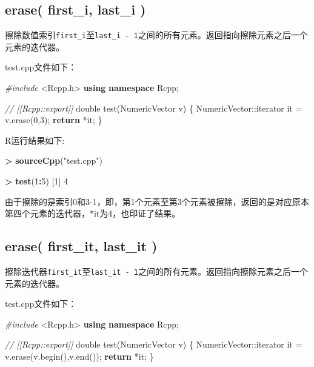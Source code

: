 \documentclass[]{ctexbook}
\newenvironment{Shaded}{\begin{snugshade}}{\end{snugshade}}
\newcommand{\KeywordTok}[1]{\textcolor[rgb]{0.13,0.29,0.53}{\textbf{#1}}}
\newcommand{\DataTypeTok}[1]{\textcolor[rgb]{0.13,0.29,0.53}{#1}}
\newcommand{\DecValTok}[1]{\textcolor[rgb]{0.00,0.00,0.81}{#1}}
\newcommand{\StringTok}[1]{\textcolor[rgb]{0.31,0.60,0.02}{#1}}
\newcommand{\ImportTok}[1]{#1}
\newcommand{\CommentTok}[1]{\textcolor[rgb]{0.56,0.35,0.01}{\textit{#1}}}
\newcommand{\ControlFlowTok}[1]{\textcolor[rgb]{0.13,0.29,0.53}{\textbf{#1}}}
\newcommand{\OperatorTok}[1]{\textcolor[rgb]{0.81,0.36,0.00}{\textbf{#1}}}
\newcommand{\PreprocessorTok}[1]{\textcolor[rgb]{0.56,0.35,0.01}{\textit{#1}}}
\newcommand{\NormalTok}[1]{#1}
\begin{document}
\subsection{erase( first\_i, last\_i )}\label{erase-first-lasti}

擦除数值索引\texttt{first\_i}至\texttt{last\_i\ -\ 1}之间的所有元素。返回指向擦除元素之后一个元素的迭代器。

test.cpp文件如下：

\begin{Shaded}
\begin{Highlighting}[]
\PreprocessorTok{#include }\ImportTok{<Rcpp.h>}
\KeywordTok{using} \KeywordTok{namespace}\NormalTok{ Rcpp;}

\CommentTok{// [[Rcpp::export]]}
\DataTypeTok{double}\NormalTok{ test(NumericVector v) \{}
\NormalTok{  NumericVector::iterator it = v.erase(}\DecValTok{0}\NormalTok{,}\DecValTok{3}\NormalTok{);}
  \ControlFlowTok{return}\NormalTok{ *it;}
\NormalTok{\}}
\end{Highlighting}
\end{Shaded}

R运行结果如下:

\begin{Shaded}
\begin{Highlighting}[]
\OperatorTok{>}\StringTok{ }\KeywordTok{sourceCpp}\NormalTok{(}\StringTok{"test.cpp"}\NormalTok{)}

\OperatorTok{>}\StringTok{ }\KeywordTok{test}\NormalTok{(}\DecValTok{1}\OperatorTok{:}\DecValTok{5}\NormalTok{)}
\NormalTok{[}\DecValTok{1}\NormalTok{] }\DecValTok{4}
\end{Highlighting}
\end{Shaded}

由于擦除的是索引0和3-1，即，第1个元素至第3个元素被擦除，返回的是对应原本第四个元素的迭代器，*it为4，也印证了结果。

\subsection{erase( first\_it, last\_it )}\label{erase-first-lastit}

擦除迭代器\texttt{first\_it}至\texttt{last\_it\ -\ 1}之间的所有元素。返回指向擦除元素之后一个元素的迭代器。

test.cpp文件如下：

\begin{Shaded}
\begin{Highlighting}[]
\PreprocessorTok{#include }\ImportTok{<Rcpp.h>}
\KeywordTok{using} \KeywordTok{namespace}\NormalTok{ Rcpp;}

\CommentTok{// [[Rcpp::export]]}
\DataTypeTok{double}\NormalTok{ test(NumericVector v) \{}
\NormalTok{  NumericVector::iterator it = v.erase(v.begin(),v.end());}
  \ControlFlowTok{return}\NormalTok{ *it;}
\NormalTok{\}}
\end{Highlighting}
\end{Shaded}
\end{document}

